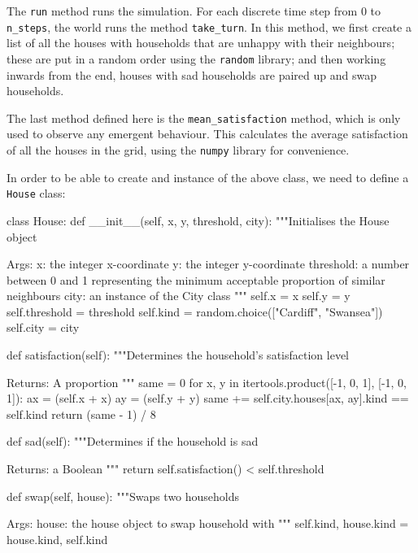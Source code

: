 The \texttt{run} method runs the simulation. For each discrete time
step from 0 to \texttt{n_steps}, the world runs the method
\texttt{take_turn}.
In this method, we first create a list of all the houses with households that
are unhappy with their neighbours; these are put in a random order using the
\texttt{random} library; and then working inwards from the end,
houses with sad households are paired up and swap households.

The last method defined here is the \texttt{mean_satisfaction}
method, which is only used to observe any emergent behaviour.
This calculates the average satisfaction of all the houses in the grid, using
the \texttt{numpy} library for convenience.

In order to be able to create and instance of the above class, we need to define
a \texttt{House} class:

\begin{pyin}
class House:
    def __init__(self, x, y, threshold, city):
        """Initialises the House object

        Args:
            x: the integer x-coordinate
            y: the integer y-coordinate
            threshold: a number between 0 and 1 representing
              the minimum acceptable proportion of similar
              neighbours
            city: an instance of the City class
        """
        self.x = x
        self.y = y
        self.threshold = threshold
        self.kind = random.choice(["Cardiff", "Swansea"])
        self.city = city
    
    def satisfaction(self):
        """Determines the household's satisfaction level

        Returns:
            A proportion
        """
        same = 0
        for x, y in itertools.product([-1, 0, 1], [-1, 0, 1]):
            ax = (self.x + x) %
            ay = (self.y + y) %
            same += self.city.houses[ax, ay].kind == self.kind
        return (same - 1) / 8
    
    def sad(self):
        """Determines if the household is sad

        Returns:
            a Boolean
        """
        return self.satisfaction() < self.threshold
    
    def swap(self, house):
        """Swaps two households

        Args:
            house: the house object to swap household with
        """
        self.kind, house.kind = house.kind, self.kind
\end{pyin}

